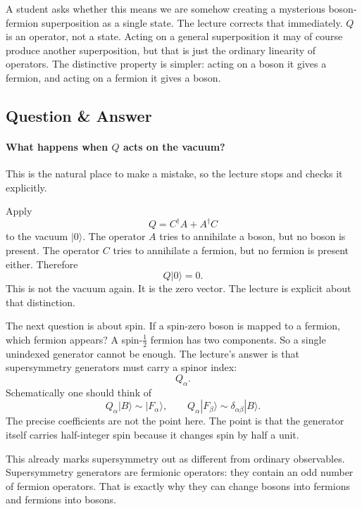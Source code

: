A student asks whether this means we are somehow creating a mysterious boson-fermion superposition as a single state. The lecture corrects that immediately. \(Q\) is an operator, not a state. Acting on a general superposition it may of course produce another superposition, but that is just the ordinary linearity of operators. The distinctive property is simpler: acting on a boson it gives a fermion, and acting on a fermion it gives a boson.

\subsection{Question \& Answer}

\paragraph{What happens when \(Q\) acts on the vacuum?}

This is the natural place to make a mistake, so the lecture stops and checks it explicitly.

Apply
\begin{equation}
Q = C^\dagger A + A^\dagger C
\end{equation}
to the vacuum \(|0\rangle\). The operator \(A\) tries to annihilate a boson, but no boson is present. The operator \(C\) tries to annihilate a fermion, but no fermion is present either. Therefore
\begin{equation}
Q|0\rangle = 0.
\end{equation}
This is not the vacuum again. It is the zero vector. The lecture is explicit about that distinction.

The next question is about spin. If a spin-zero boson is mapped to a fermion, which fermion appears? A spin-\(\tfrac12\) fermion has two components. So a single unindexed generator cannot be enough. The lecture's answer is that supersymmetry generators must carry a spinor index:
\begin{equation}
Q_\alpha.
\end{equation}
Schematically one should think of
\begin{equation}
Q_\alpha |B\rangle \sim |F_\alpha\rangle,
\qquad
Q_\alpha |F_\beta\rangle \sim \delta_{\alpha\beta}|B\rangle.
\end{equation}
The precise coefficients are not the point here. The point is that the generator itself carries half-integer spin because it changes spin by half a unit.

This already marks supersymmetry out as different from ordinary observables. Supersymmetry generators are fermionic operators: they contain an odd number of fermion operators. That is exactly why they can change bosons into fermions and fermions into bosons.

